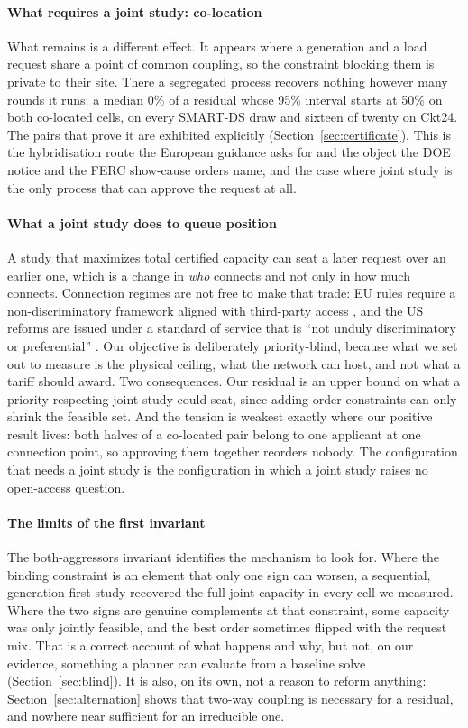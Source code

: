 \documentclass[review,authoryear,12pt]{elsarticle}
\begin{document}
\paragraph{What requires a joint study: co-location}
What remains is a different effect. It appears where a
generation and a load request share a point of common coupling, so the
constraint blocking them is private to their site. There a segregated process
recovers nothing however many rounds it runs: a median 0\% of a residual
whose 95\% interval starts at 50\% on both co-located cells, on every SMART-DS
draw and sixteen of twenty on Ckt24. The pairs that prove it are exhibited
explicitly (Section~\ref{sec:certificate}). This is the hybridisation route the
European guidance asks for \citep{ec_gridconn2025} and the object the DOE notice
and the FERC show-cause orders name, and the case where joint study is the only
process that can approve the request at all.

\paragraph{What a joint study does to queue position}
A study that maximizes total certified capacity can seat a later request over an
earlier one, which is a change in \emph{who} connects and not only in how much
connects. Connection regimes are not free to make that trade: EU rules require a
non-discriminatory framework aligned with third-party access
\citep{ec_gridconn2025}, and the US reforms are issued under a standard of
service that is ``not unduly discriminatory or preferential''
\citep{ferc845_2018}. Our objective is deliberately priority-blind, because what
we set out to measure is the physical ceiling, what the network can host, and
not what a tariff should award. Two consequences. Our residual is an
upper bound on what a priority-respecting joint study could seat, since adding
order constraints can only shrink the feasible set. And the tension is weakest
exactly where our positive result lives: both halves of a co-located pair belong
to one applicant at one connection point, so approving them together reorders
nobody. The configuration that needs a joint study is the configuration in which
a joint study raises no open-access question.

\paragraph{The limits of the first invariant}
The both-aggressors invariant identifies the mechanism to look for. Where the
binding constraint is an element that only one sign can worsen, a sequential,
generation-first study recovered the full joint capacity in every cell we
measured. Where the two signs are genuine complements at that constraint, some
capacity was only jointly feasible, and the best order sometimes flipped with
the request mix. That is a correct account of what happens and why, but not,
on our evidence, something a planner can evaluate from a baseline solve
(Section~\ref{sec:blind}). It is also, on its own, not a reason to reform
anything: Section~\ref{sec:alternation} shows that two-way coupling is
necessary for a residual, and nowhere near sufficient for an irreducible one.
\end{document}
